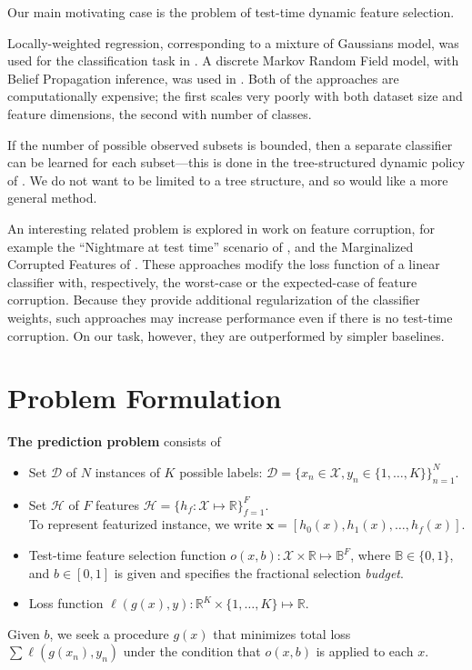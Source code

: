 Our main motivating case is the problem of test-time dynamic feature selection.

Locally-weighted regression, corresponding to a mixture of Gaussians model, was used for the classification task in \cite{Gao-NIPS-2011}.
A discrete Markov Random Field model, with Belief Propagation inference, was used in \cite{Karayev-NIPS-2012}.
Both of the approaches are computationally expensive; the first scales very poorly with both dataset size and feature dimensions, the second with number of classes.

If the number of possible observed subsets is bounded, then a separate classifier can be learned for each subset---this is done in the tree-structured dynamic policy of \cite{Xu-ICML-2013}.
We do not want to be limited to a tree structure, and so would like a more general method.

An interesting related problem is explored in work on feature corruption, for example the ``Nightmare at test time'' scenario of \cite{Globerson-ICML-2006}, and the Marginalized Corrupted Features of \cite{Maaten-ICML-2013}.
These approaches modify the loss function of a linear classifier with, respectively, the worst-case or the expected-case of feature corruption.
Because they provide additional regularization of the classifier weights, such approaches may increase performance even if there is no test-time corruption.
On our task, however, they are outperformed by simpler baselines.

\section{Problem Formulation}


\begin{mydef} \label{def:problem}
\textbf{The prediction problem} consists of 
\begin{itemize}
\item Set $\mathcal{D}$ of $N$ instances of $K$ possible labels: $\mathcal{D} = \{x_n \in \mathcal{X}, y_n \in \{1, \dots, K\}\}_{n=1}^N$.

\item Set $\mathcal{H}$ of $F$ features $\mathcal{H} = \{h_f : \mathcal{X} \mapsto \mathbb{R} \}_{f=1}^F$.\\
To represent featurized instance, we write $\mathbf{x} = [h_0(x), h_1(x), \dots, h_f(x)]$.

\item Test-time feature selection function $o(x, b): \mathcal{X} \times \mathbb{R} \mapsto \mathbb{B}^F$, where $\mathbb{B} \in \{0, 1\}$, and $b \in [0, 1]$ is given and specifies the fractional selection \emph{budget}.

\item Loss function $\ell(g(x), y): \mathbb{R}^K \times \{1, \dots, K\} \mapsto \mathbb{R}$.
\end{itemize}

Given $b$, we seek a procedure $g(x)$ that minimizes total loss $\sum \ell(g(x_n), y_n)$ under the condition that $o(x, b)$ is applied to each $x$.
\end{mydef}

